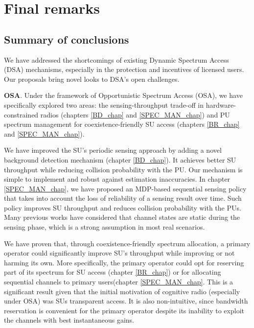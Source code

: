 \chapter{Final remarks}\label{Conclusion_chap}

\section{Summary of conclusions} %

We have addressed the shortcomings of existing Dynamic Spectrum Access (DSA) mechanisms, especially in the protection and incentives of licensed users. Our proposals bring novel looks to DSA's open challenges. 

\textbf{OSA}. Under the framework of Opportunistic Spectrum Access (OSA), we have specifically explored two areas: the sensing-throughput trade-off in hardware-constrained radios (chapters \ref{BD_chap} and \ref{SPEC_MAN_chap}) and PU spectrum management for coexistence-friendly SU access (chapters \ref{BR_chap} and \ref{SPEC_MAN_chap}). 

We have improved the SU's periodic sensing approach by adding a novel background detection mechanism (chapter \ref{BD_chap}). It achieves better SU throughput while reducing collision probability with the PU. Our mechanism is simple to implement and robust against estimation inaccuracies. In chapter \ref{SPEC_MAN_chap}, we have proposed an MDP-based sequential sensing policy that takes into account the loss of reliability of a sensing result over time. Such policy improves SU throughput and reduces collision probability with the PUs. Many previous works have considered that channel states are static during the sensing phase, which is a strong assumption in most real scenarios. 

We have proven that, through coexistence-friendly spectrum allocation, a primary operator could significantly improve SU's throughput while improving or not harming its own. More specifically, the primary operator could opt for reserving part of its spectrum for SU access (chapter \ref{BR_chap}) or for allocating sequential channels to primary users(chapter \ref{SPEC_MAN_chap}. 
This is a significant result given that the initial motivation of cognitive radio (especially under OSA) was SUs transparent access. 
It is also non-intuitive, since bandwidth reservation is convenient for the primary operator despite its inability to exploit the channels with best instantaneous gains. 

